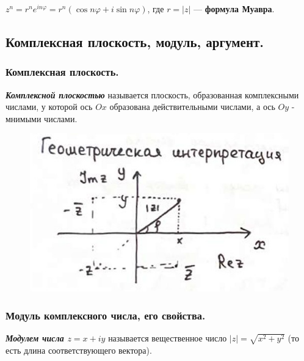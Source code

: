 $z^n = r^n e^{in\varphi} = r^n(\cos n \varphi + i \sin n \varphi)$, где $r = |z|$ — \textbf{формула Муавра}.


\newpage


\subsection{
    Комплексная плоскость, модуль, аргумент.
}

\subsubsection{
    Комплексная плоскость.
}

\begin{definition}
    \textbf{\textit{Комплексной плоскостью}} называется плоскость, образованная комплексными числами, у которой ось $Ox$ образована действительными числами, а ось $Oy$ - мнимыми числами.
\end{definition}

\begin{figure}[H]
    \centering
    \includegraphics[scale=0.55]{images/1_1.jpg}
    \label{fig:picture_1_1}
\end{figure}

\subsubsection{
    Модуль комплексного числа, его свойства.
}

\begin{definition}
    \textbf{\textit{Модулем числа $z = x + iy$}} называется вещественное число $|z| = \sqrt{x^2 + y^2}$ (то есть длина соответствующего вектора).
\end{definition}

